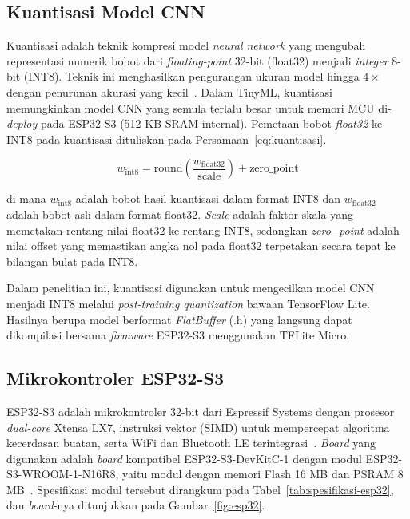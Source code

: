 \subsection{Kuantisasi Model CNN}

Kuantisasi adalah teknik kompresi model \textit{neural network} yang mengubah
representasi numerik bobot dari \textit{floating-point} 32-bit (float32) menjadi
\textit{integer} 8-bit (INT8). Teknik ini menghasilkan pengurangan ukuran model
hingga $4\times$ dengan penurunan akurasi yang kecil~\cite{jacob_2018}. Dalam
TinyML, kuantisasi memungkinkan model CNN yang semula terlalu besar untuk memori
MCU di-\textit{deploy} pada ESP32-S3 (512 KB SRAM internal). Pemetaan bobot \textit{float32} ke INT8 pada kuantisasi dituliskan pada Persamaan~\ref{eq:kuantisasi}.

\begin{equation}
\label{eq:kuantisasi}
w_\text{int8} = \text{round}\!\left(\frac{w_\text{float32}}{\text{scale}}\right)
+ \text{zero\_point}
\end{equation}

\noindent di mana $w_\text{int8}$ adalah bobot hasil kuantisasi dalam format
INT8 dan $w_\text{float32}$ adalah bobot asli dalam format float32.
\textit{Scale} adalah faktor skala yang memetakan rentang nilai float32 ke
rentang INT8, sedangkan \textit{zero\_point} adalah nilai offset yang memastikan
angka nol pada float32 terpetakan secara tepat ke bilangan bulat pada INT8.

Dalam penelitian ini, kuantisasi digunakan untuk mengecilkan model CNN
menjadi INT8 melalui \textit{post-training quantization} bawaan TensorFlow
Lite. Hasilnya berupa model berformat \textit{FlatBuffer} (.h) yang langsung
dapat dikompilasi bersama \textit{firmware} ESP32-S3 menggunakan TFLite Micro.

\subsection{Mikrokontroler ESP32-S3}

ESP32-S3 adalah mikrokontroler 32-bit dari Espressif Systems dengan prosesor \textit{dual-core} Xtensa LX7, instruksi vektor (SIMD) untuk mempercepat algoritma kecerdasan buatan, serta WiFi dan Bluetooth LE terintegrasi~\cite{espressif_esp32s3_datasheet}. \textit{Board} yang digunakan adalah \textit{board} kompatibel ESP32-S3-DevKitC-1 dengan modul ESP32-S3-WROOM-1-N16R8, yaitu modul dengan memori Flash 16 MB dan PSRAM 8 MB~\cite{espressif_esp32s3_wroom1}. Spesifikasi modul tersebut dirangkum pada Tabel~\ref{tab:spesifikasi-esp32}, dan \textit{board}-nya ditunjukkan pada Gambar~\ref{fig:esp32}.

